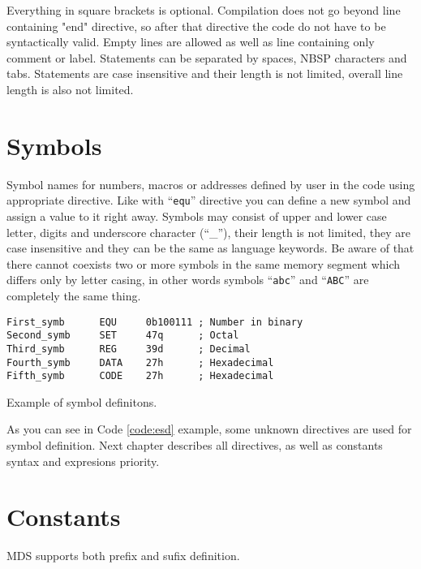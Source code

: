     Everything in square brackets is optional. Compilation does not go beyond line containing "end" directive, so after that directive the code do not have to be syntactically valid. Empty lines are allowed as well as line containing only comment or label. Statements can be separated by spaces, NBSP characters and tabs. Statements are case insensitive and their length is not limited, overall line length is also not limited.

\section{Symbols}
    Symbol names for numbers, macros or addresses defined by user in the code using appropriate directive. Like with ``\texttt{equ}'' directive you can define a new symbol and assign a value to it right away. Symbols may consist of upper and lower case letter, digits and underscore character (``\_''), their length is not limited, they are case insensitive and they can be the same as language keywords. Be aware of that there cannot coexists two or more symbols in the same memory segment which differs only by letter casing, in other words symbols ``\texttt{abc}'' and ``\texttt{ABC}'' are completely the same thing.

    \begin{code}[h!]
    {
        \usecodefont

        \verb'First_symb      EQU     0b100111 ; Number in binary'\\
        \verb'Second_symb     SET     47q      ; Octal'\\
        \verb'Third_symb      REG     39d      ; Decimal'\\
        \verb'Fourth_symb     DATA    27h      ; Hexadecimal'\\
        \verb'Fifth_symb      CODE    27h      ; Hexadecimal'

        \caption{Example of symbol definitons.}
        \label{code:esd}
    }
    \end{code}

    As you can see in Code \ref{code:esd} example, some unknown directives are used for symbol definition. Next chapter describes all directives, as well as constants syntax and expresions priority.

\section{Constants}
    MDS supports both prefix and sufix definition.

